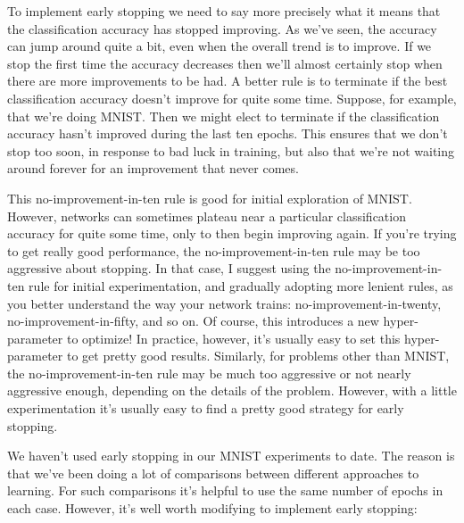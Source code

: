 \documentclass[a4paper,twoside,10pt]{book}
\begin{document}
To implement early stopping we need to say more precisely what it means that the classification accuracy has stopped improving. As we've seen, the accuracy can jump around quite a bit, even when the overall trend is to improve. If we stop the first time the accuracy decreases then we'll almost certainly stop when there are more improvements to be had. A better rule is to terminate if the best classification accuracy doesn't improve for quite some time. Suppose, for example, that we're doing MNIST. Then we might elect to terminate if the classification accuracy hasn't improved during the last ten epochs. This ensures that we don't stop too soon, in response to bad luck in training, but also that we're not waiting around forever for an improvement that never comes.

This no-improvement-in-ten rule is good for initial exploration of MNIST. However, networks can sometimes plateau near a particular classification accuracy for quite some time, only to then begin improving again. If you're trying to get really good performance, the no-improvement-in-ten rule may be too aggressive about stopping. In that case, I suggest using the no-improvement-in-ten rule for initial experimentation, and gradually adopting more lenient rules, as you better understand the way your network trains: no-improvement-in-twenty, no-improvement-in-fifty, and so on. Of course, this introduces a new hyper-parameter to optimize! In practice, however, it's usually easy to set this hyper-parameter to get pretty good results. Similarly, for problems other than MNIST, the no-improvement-in-ten rule may be much too aggressive or not nearly aggressive enough, depending on the details of the problem. However, with a little experimentation it's usually easy to find a pretty good strategy for early stopping.

We haven't used early stopping in our MNIST experiments to date. The reason is that we've been doing a lot of comparisons between different approaches to learning. For such comparisons it's helpful to use the same number of epochs in each case. However, it's well worth modifying  to implement early stopping:
\end{document}
